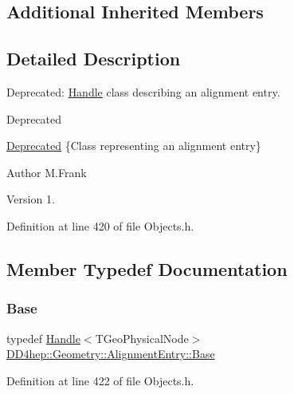 \subsection*{Additional Inherited Members}


\subsection{Detailed Description}
Deprecated\+: \hyperlink{class_d_d4hep_1_1_handle}{Handle} class describing an alignment entry. 

\begin{DoxyRefDesc}{Deprecated}
\item[\hyperlink{deprecated__deprecated000001}{Deprecated}]\{Class representing an alignment entry\}\end{DoxyRefDesc}


\begin{DoxyAuthor}{Author}
M.\+Frank 
\end{DoxyAuthor}
\begin{DoxyVersion}{Version}
1. 
\end{DoxyVersion}


Definition at line 420 of file Objects.\+h.



\subsection{Member Typedef Documentation}
\hypertarget{class_d_d4hep_1_1_geometry_1_1_alignment_entry_a5292caf0fb24d8750c2c24ef8f69a258}{}\label{class_d_d4hep_1_1_geometry_1_1_alignment_entry_a5292caf0fb24d8750c2c24ef8f69a258} 
\subsubsection{\texorpdfstring{Base}{Base}}
{\footnotesize\ttfamily typedef \hyperlink{class_d_d4hep_1_1_handle}{Handle}$<$T\+Geo\+Physical\+Node$>$ \hyperlink{class_d_d4hep_1_1_geometry_1_1_alignment_entry_a5292caf0fb24d8750c2c24ef8f69a258}{D\+D4hep\+::\+Geometry\+::\+Alignment\+Entry\+::\+Base}}



Definition at line 422 of file Objects.\+h.



